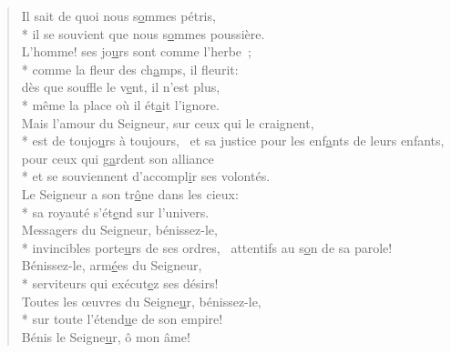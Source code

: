 \begin{verse}
Il sait de quoi nous s\underline{o}mmes pétris, \\*
il se souvient que nous s\underline{o}mmes poussière. \\
L’homme! ses jo\underline{u}rs sont comme l’herbe ; \\*
comme la fleur des ch\underline{a}mps, il fleurit: \\
dès que souffle le v\underline{e}nt, il n’est plus, \\*
même la place où il ét\underline{a}it l’ignore. \\

Mais l’amour du Seigneur, sur ceux qui le craignent, \\*
est de toujo\underline{u}rs à toujours,~\psalmstar
et sa justice pour les enf\underline{a}nts de leurs enfants, \\
pour ceux qui g\underline{a}rdent son alliance \\*
et se souviennent d’accompl\underline{i}r ses volontés. \\
Le Seigneur a son tr\underline{ô}ne dans les cieux: \\*
sa royauté s’ét\underline{e}nd sur l’univers. \\

Messagers du Seigneur, bénissez-le, \\*
invincibles porte\underline{u}rs de ses ordres,~\psalmstar
attentifs au s\underline{o}n de sa parole! \\
Bénissez-le, arm\underline{é}es du Seigneur, \\*
serviteurs qui exécut\underline{e}z ses désirs! \\
Toutes les œuvres du Seigne\underline{u}r, bénissez-le, \\*
sur toute l’étend\underline{u}e de son empire! \\

Bénis le Seigne\underline{u}r, ô mon âme! \\
\end{verse}

